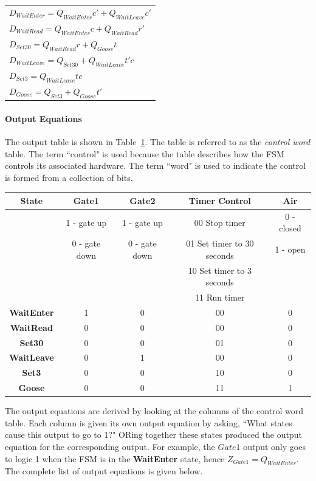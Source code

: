\begin{tabular}{l}
$D_{WaitEnter}	= Q_{WaitEnter}c' + Q_{WaitLeave}c'$  \\
$D_{WaitRead}	= Q_{WaitEnter}c + Q_{WaitRead}r'$ \\
$D_{Set30}	= Q_{WaitRead}r + Q_{Goose}t$ \\
$D_{WaitLeave}	= Q_{Set30} + Q_{WaitLeave}t'c$ \\
$D_{Set3}	= Q_{WaitLeave}tc$ \\
$D_{Goose}	= Q_{Set3} +  Q_{Goose}t'$ \\
\end{tabular}

\paragraph{Output Equations}
The output table is shown in Table~\ref{table:daisy}.  The table is
referred to as the {\it control word} table.  The term 
``control" is used because the table describes how the FSM controls 
its associated hardware.  The term ``word" is used to indicate 
the control is formed from a collection of bits.

\begin{table}[ht]
{\small
\begin{tabular}{c||c|c|c|c}
State		& Gate1		& Gate2		& Timer Control			& Air		\\ \hline \hline
		& 1 - gate up	& 1 - gate up	& 00 Stop timer			& 0 - closed \\ \hline
		& 0 - gate down	& 0 - gate down	& 01 Set timer to 30 seconds	& 1 - open	\\ \hline
		&			&			& 10 Set timer to 3 seconds	&		\\ \hline
		&			&			& 11 Run timer			& 		\\ \hline \hline
{\bf WaitEnter}	& 1			& 0			& 00					& 0		\\ \hline
{\bf WaitRead}	& 0			& 0			& 00					& 0		\\ \hline
{\bf Set30}		& 0			& 0			& 01					& 0		\\ \hline
{\bf WaitLeave}	& 0			& 1			& 00					& 0		\\ \hline
{\bf Set3}		& 0			& 0			& 10					& 0		\\ \hline
{\bf Goose}		& 0			& 0			& 11					& 1		\\
\end{tabular}
}
\label{table:daisy}
\end{table}

The output equations are derived by looking at the columns
of the control word table.  Each column is given its own
output equation by asking, ``What states cause this 
output to go to 1?"  ORing together these states produced
the output equation for the corresponding output.  For 
example, the $Gate1$ output only goes to logic 1 when the 
FSM is in the {\bf WaitEnter} state, hence 
$Z_{Gate1} = Q_{WaitEnter}$.  The complete list of output 
equations is given below.

